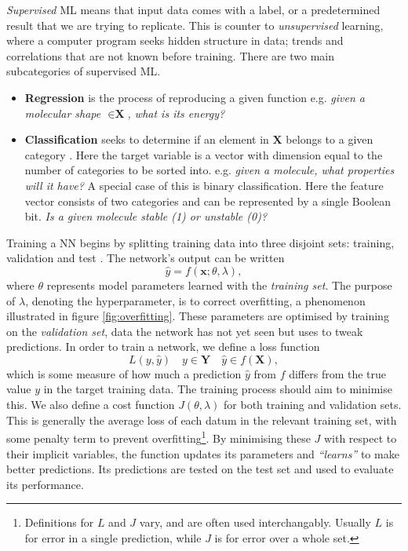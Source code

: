 \documentclass[12pt,a4paper]{article}
\begin{document}
\emph{Supervised} ML means that input data comes with a label, or a predetermined result that we are trying to replicate. This is counter to \emph{unsupervised} learning, where a computer program seeks hidden structure in data; trends and correlations that are not known before training. There are two main subcategories of supervised ML.
\begin{itemize}
    \item \textbf{Regression} is the process of reproducing a given function \cite{goodfellow_deep_2016} e.g. \textit{given a molecular shape $\in \textbf{X}$, what is its energy?}
    \item \textbf{Classification} seeks to determine if an element in $\textbf{X}$ belongs to a given category \cite{goodfellow_deep_2016}. Here the target variable is a vector with dimension equal to the number of categories to be sorted into. e.g. \emph{given a molecule, what properties will it have?} A special case of this is binary classification. Here the feature vector consists of two categories and can be represented by a single Boolean bit. \emph{Is a given molecule stable (1) or unstable (0)?}
\end{itemize}{}
Training a NN begins by splitting training data into three disjoint sets: training, validation and test \cite{goodfellow_deep_2016}. The network's output can be written \begin{equation}
    \hat{y}=f(\mathbf{x}; \theta, \lambda),
\end{equation}
where $\theta$ represents model parameters learned with the \emph{training set}. The purpose of $\lambda$, denoting the hyperparameter, is to correct overfitting, a phenomenon illustrated in figure \ref{fig:overfitting}. These parameters are optimised by training on the \emph{validation set}, data the network has not yet seen but uses to tweak predictions. In order to train a network, we define a loss function\cite{goodfellow_deep_2016} 
\begin{equation}
L(y,\hat{y}) \quad y \in \textbf{Y} \quad \hat{y} \in f(\textbf{X}),
\end{equation}
which is some measure of how much a prediction $\hat{y}$ from $f$ differs from the true value $y$ in the target training data. The training process should aim to minimise this. We also define a cost function $J(\theta,\lambda)$ for both training and validation sets. This is generally the average loss of each datum in the relevant training set, with some penalty term to prevent overfitting\footnote{Definitions for $L$ and $J$ vary, and are often used interchangably. Usually $L$ is for error in a single prediction, while $J$ is for error over a whole set.}. By minimising these $J$ with respect to their implicit variables, the function updates its parameters and \emph{\enquote{learns}} to make better predictions. Its predictions are tested on the test set and used to evaluate its performance.
\end{document}
